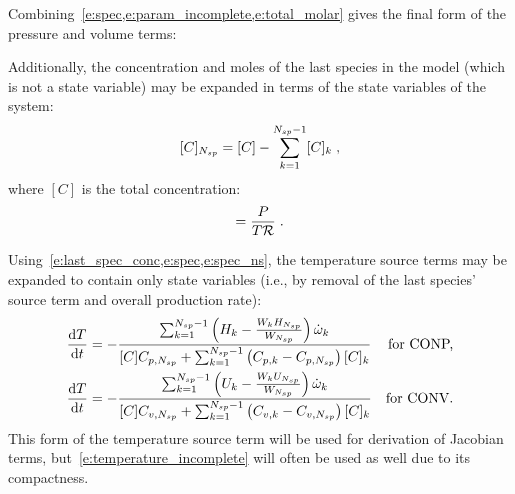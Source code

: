 \documentclass[12pt,number,sort&compress]{elsarticle}
\begin{document}
Combining~\cref{e:spec,e:param_incomplete,e:total_molar} gives the final form of the pressure and volume terms:

Additionally, the concentration and moles of the last species in the model (which is not a state variable) may be expanded in terms of the state variables of the system:
\begin{equation}
 \label{e:last_spec_conc}
   [C]_{\ns/} = [C] - \sum_{k=1}^{\ns/  - 1} [C]_{k}\;,
\end{equation}
where $[C]$ is the total concentration:
\begin{equation}
 [C] = \frac{P}{T \Ru/}\;.
\end{equation}

Using~\cref{e:last_spec_conc,e:spec,e:spec_ns}, the temperature source terms may be expanded to contain only state variables (i.e., by removal of the last species' source term and overall production rate):
\begin{subequations}
\label{e:temperature_complete}
\begin{align}
\frac{\text{d} T }{\text{d} t } &= - \frac{\sum_{k=1}^{\ns/  - 1} \left(H_{k} - \frac{W_{k} H_{\ns/}}{W_{\ns/}}\right) \dot{\omega}_{k}}{[C] {C_{p,\ns/}} + \sum_{k=1}^{\ns/  - 1} \left({C_{p, k}} - {C_{p,\ns/}}\right) [C]_{k}} &\text{\dconp/,}\\
\frac{\text{d} T }{\text{d} t } &= - \frac{\sum_{k=1}^{\ns/  - 1} \left(U_{k} - \frac{W_{k} U_{\ns/}}{W_{\ns/}}\right) \dot{\omega}_{k}}{[C] {C_{v,\ns/}} + \sum_{k=1}^{\ns/  - 1} \left({C_{v, k}} - {C_{v,\ns/}}\right) [C]_{k}} &\text{\dconv/.}
\end{align}
\end{subequations}
This form of the temperature source term will be used for derivation of Jacobian terms, but~\cref{e:temperature_incomplete} will often be used as well due to its compactness.
\end{document}

